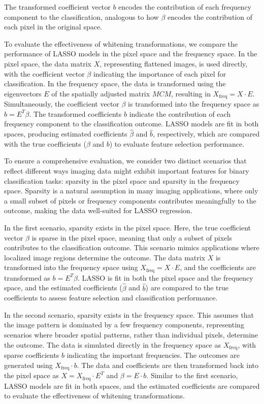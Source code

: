 \documentclass[12pt]{article}
\begin{document}
The transformed coefficient vector \( b \) encodes the contribution of each frequency component to the classification, analogous to how \( \beta \) encodes the contribution of each pixel in the original space.

To evaluate the effectiveness of whitening transformations, we compare the performance of LASSO models in the pixel space and the frequency space. In the pixel space, the data matrix \( X \), representing flattened images, is used directly, with the coefficient vector \( \beta \) indicating the importance of each pixel for classification. In the frequency space, the data is transformed using the eigenvectors \( E \) of the spatially adjusted matrix \( MCM \), resulting in \( X_{\text{freq}} = X \cdot E \). Simultaneously, the coefficient vector \( \beta \) is transformed into the frequency space as \( b = E^T \beta \). The transformed coefficients \( b \) indicate the contribution of each frequency component to the classification outcome. LASSO models are fit in both spaces, producing estimated coefficients \( \hat{\beta} \) and \( \hat{b} \), respectively, which are compared with the true coefficients (\( \beta \) and \( b \)) to evaluate feature selection performance.

To ensure a comprehensive evaluation, we consider two distinct scenarios that reflect different ways imaging data might exhibit important features for binary classification tasks: sparsity in the pixel space and sparsity in the frequency space. Sparsity is a natural assumption in many imaging applications, where only a small subset of pixels or frequency components contributes meaningfully to the outcome, making the data well-suited for LASSO regression.

In the first scenario, sparsity exists in the pixel space. Here, the true coefficient vector \( \beta \) is sparse in the pixel space, meaning that only a subset of pixels contributes to the classification outcome. This scenario mimics applications where localized image regions determine the outcome. The data matrix \( X \) is transformed into the frequency space using \( X_{\text{freq}} = X \cdot E \), and the coefficients are transformed as \( b = E^T \beta \). LASSO is fit in both the pixel space and the frequency space, and the estimated coefficients (\( \hat{\beta} \) and \( \hat{b} \)) are compared to the true coefficients to assess feature selection and classification performance.

In the second scenario, sparsity exists in the frequency space. This assumes that the image pattern is dominated by a few frequency components, representing scenarios where broader spatial patterns, rather than individual pixels, determine the outcome. The data is simulated directly in the frequency space as \( X_{\text{freq}} \), with sparse coefficients \( b \) indicating the important frequencies. The outcomes are generated using \( X_{\text{freq}} \cdot b \). The data and coefficients are then transformed back into the pixel space as \( X = X_{\text{freq}} \cdot E^T \) and \( \beta = E \cdot b \). Similar to the first scenario, LASSO models are fit in both spaces, and the estimated coefficients are compared to evaluate the effectiveness of whitening transformations.
\end{document}
